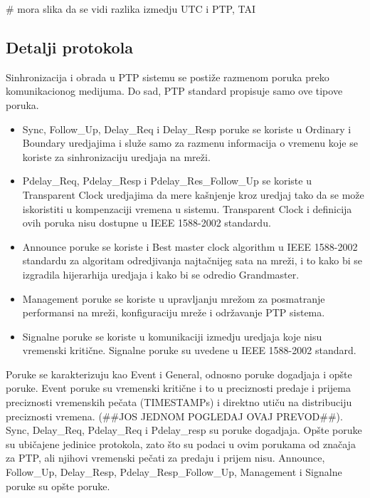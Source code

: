 \documentclass[a4paper,12pt, master]{etf}
\begin{document}
	\# mora slika da se vidi razlika izmedju UTC i PTP, TAI

	\subsection{Detalji protokola}

	Sinhronizacija i obrada u PTP sistemu se posti\v{z}e razmenom poruka preko 
	komunikacionog medijuma. Do sad, PTP standard propisuje samo ove tipove 
	poruka.

	\begin{itemize}
		\item Sync, Follow\_Up, Delay\_Req i Delay\_Resp poruke se koriste u 
		Ordinary i Boundary uredjajima i slu\v{z}e samo za razmenu informacija 
		o vremenu koje se koriste za sinhronizaciju uredjaja na mre\v{z}i.
		\item Pdelay\_Req, Pdelay\_Resp i Pdelay\_Res\_Follow\_Up se koriste u 
		Transparent Clock uredjajima da mere ka\v{s}njenje kroz uredjaj tako da 
		se mo\v{z}e iskoristiti u kompenzaciji vremena u sistemu. Transparent 
		Clock i definicija ovih poruka nisu dostupne u IEEE 1588-2002 standardu.
		\item Announce poruke se koriste i Best master clock algorithm u IEEE 
		1588-2002 standardu za algoritam odredjivanja najta\v{c}nijeg sata na 
		mre\v{z}i, i to kako bi se izgradila hijerarhija uredjaja i kako bi se 
		odredio Grandmaster.
		\item Management poruke se koriste u upravljanju mre\v{z}om za 
		posmatranje performansi na mre\v{z}i, konfiguraciju mre\v{z}e i 
		odr\v{z}avanje PTP sistema.
		\item Signalne poruke se koriste u komunikaciji izmedju uredjaja koje 
		nisu vremenski kriti\v{c}ne. Signalne poruke su uvedene u IEEE 
		1588-2002 standard.
	\end{itemize}

	Poruke se karakterizuju kao Event i General, odnosno poruke dogadjaja i 
	op\v{s}te poruke. Event	poruke su vremenski kriti\v{c}ne i to u preciznosti 
	predaje i prijema preciznosti vremenskih pe\v{c}ata (TIMESTAMPs) i direktno 
	uti\v{c}u na distribuciju preciznosti vremena. (\#\#JOS JEDNOM POGLEDAJ 
	OVAJ PREVOD\#\#). Sync, Delay\_Req, Pdelay\_Req i Pdelay\_resp su poruke 
	dogadjaja. Op\v{s}te poruke su ubi\v{c}ajene jedinice protokola, zato 
	\v{s}to su podaci u ovim porukama od zna\v{c}aja za PTP, ali njihovi  
	vremenski pe\v{c}ati za predaju i prijem nisu. Announce, Follow\_Up,
	Delay\_Resp, Pdelay\_Resp\_Follow\_Up, Management i Signalne poruke su 
	op\v{s}te poruke.
\end{document}
